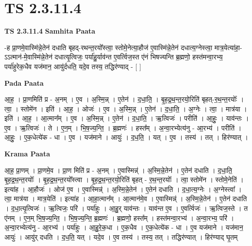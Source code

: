 \documentclass[17pt]{extarticle}
\begin{document}
\section*{ TS 2.3.11.4 }

\textbf{TS 2.3.11.4 } \newline
\textbf{Samhita Paata} \newline

-ह प्रा॒णमे॒वास्मि॑न्ने॒तेन॑ दधाति बृहद्-रथन्त॒रयो᳚स्त्वा॒ स्तोमे॒नेत्या॒हौज॑ ए॒वास्मि॑न्ने॒तेन॑ दधात्य॒ग्नेस्त्वा॒ मात्र॒येत्या॑हा॒-ऽऽत्मान॑-मे॒वास्मि॑न्ने॒तेन॑ दधात्यृ॒त्विजः॒ पर्या॑हु॒र्याव॑न्त ए॒वर्त्विज॒स्त ए॑नं भिषज्यन्ति ब्र॒ह्मणो॒ हस्त॑मन्वा॒रभ्य॒ पर्या॑हुरेक॒धैव यज॑मान॒ आयु॑र्दधति॒ यदे॒व तस्य॒ तद्धिर॑ण्याद् - [  ] \newline

\textbf{Pada Paata} \newline

आ॒ह॒ । प्रा॒णमिति॑ प्र - अ॒नम् । ए॒व । अ॒स्मि॒न्न् । ए॒तेन॑ । द॒धा॒ति॒ । बृ॒ह॒द्र॒थ॒न्त॒रयो॒रिति॑ बृहत्-र॒थ॒न्त॒रयोः᳚ । त्वा॒ । स्तोमे॑न । इति॑ । आ॒ह॒ । ओजः॑ । ए॒व । अ॒स्मि॒न्न् । ए॒तेन॑ । द॒धा॒ति॒ । अ॒ग्नेः । त्वा॒ । मात्र॑या । इति॑ । आ॒ह॒ । आ॒त्मान᳚म् । ए॒व । अ॒स्मि॒न्न् । ए॒तेन॑ । द॒धा॒ति॒ । ऋ॒त्विजः॑ । परीति॑ । आ॒हुः॒ । याव॑न्तः । ए॒व । ऋ॒त्विजः॑ । ते । ए॒न॒म् । भि॒ष॒ज्य॒न्ति॒ । ब्र॒ह्मणः॑ । हस्त᳚म् । अ॒न्वा॒रभ्येत्य॑नु - आ॒रभ्य॑ । परीति॑ । आ॒हुः॒ । ए॒क॒धेत्ये॑क - धा । ए॒व । यज॑माने । आयुः॑ । द॒ध॒ति॒ । यत् । ए॒व । तस्य॑ । तत् । हिर॑ण्यात् ।  \newline


\textbf{Krama Paata} \newline

आ॒ह॒ प्रा॒णम् । प्रा॒णमे॒व । प्रा॒ण मिति॑ प्र - अ॒नम् । ए॒वास्मिन्न्॑ । अ॒स्मि॒न्ने॒तेन॑ । ए॒तेन॑ दधाति । द॒धा॒ति॒ बृ॒ह॒द्र॒थ॒न्त॒रयोः᳚ । बृ॒ह॒द्र॒थ॒न्त॒रयो᳚स्त्वा । बृ॒ह॒द्र॒थ॒न्त॒रयो॒रिति॑ बृहत् - र॒थ॒न्त॒रयोः᳚ । त्वा॒ स्तोमे॑न । स्तोमे॒नेति॑ । इत्या॑ह । आ॒हौजः॑ । ओज॑ ए॒व । ए॒वास्मिन्न्॑ । अ॒स्मि॒न्ने॒तेन॑ । ए॒तेन॑ दधाति । द॒धा॒त्य॒ग्नेः । अ॒ग्नेस्त्वा᳚ । त्वा॒ मात्र॑या । मात्र॒येति॑ । इत्या॑ह । आ॒हा॒त्मान᳚म् । आ॒त्मान॑मे॒व । ए॒वास्मिन्न्॑ । अ॒स्मि॒न्ने॒तेन॑ । ए॒तेन॑ दधाति । द॒धा॒त्यृ॒त्विजः॑ । ऋ॒त्विजः॒ परि॑ । पर्या॑हुः । आ॒हु॒र् याव॑न्तः । याव॑न्त ए॒व । ए॒वर्त्विजः॑ । ऋ॒त्विज॒स्ते । त ए॑नम् । ए॒न॒म् भि॒ष॒ज्य॒न्ति॒ । भि॒ष॒ज्य॒न्ति॒ ब्र॒ह्मणः॑ । ब्र॒ह्मणो॒ हस्त᳚म् । हस्त॑मन्वा॒रभ्य॑ । अ॒न्वा॒रभ्य॒ परि॑ । अ॒न्वा॒रभ्येत्य॑नु - आ॒रभ्य॑ । पर्या॑हुः । आ॒हु॒रे॒क॒धा । ए॒क॒धैव । ए॒क॒धेत्ये॑क - धा । ए॒व यज॑माने । यज॑मान॒ आयुः॑ । आयु॑र् दधति । द॒ध॒ति॒ यत् । यदे॒व । ए॒व तस्य॑ । तस्य॒ तत् । तद्धिर॑ण्यात् । हिर॑ण्याद् घृ॒तम् \newline
\end{document}
